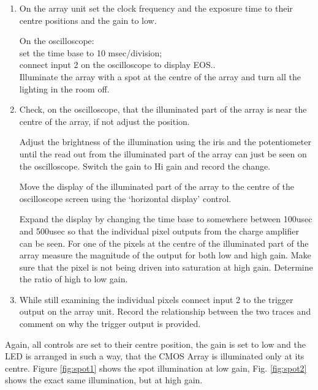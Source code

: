 \begin{enumerate}
	\item On the array unit set the clock frequency and the exposure time to their centre positions and
the gain to low.

On the oscilloscope:\\
set the time base to 10 msec/division;\\
connect input 2 on the oscilloscope to display EOS..\\
Illuminate the array with a spot at the centre of the array and turn all the lighting in the room
off.
	\item Check, on the oscilloscope, that the illuminated part of the array is near the centre of the
array, if not adjust the position.

Adjust the brightness of the illumination using the iris and the potentiometer until the read
out from the illuminated part of the array can just be seen on the oscilloscope. Switch the
gain to Hi gain and record the change.

Move the display of the illuminated part of the array to the centre of the oscilloscope screen
using the ‘horizontal display’ control.

Expand the display by changing the time base to somewhere between 100usec and 500usec
so that the individual pixel outputs from the charge amplifier can be seen. For one of the
pixels at the centre of the illuminated part of the array measure the magnitude of the output
for both low and high gain. Make sure that the pixel is not being driven into saturation at
high gain. Determine the ratio of high to low gain.

	\item While still examining the individual pixels connect input 2 to the trigger output on the array
unit. Record the relationship between the two traces and comment on why the trigger
output is provided.
\end{enumerate}

Again, all controls are set to their centre position, the gain is set to low and the LED is arranged in such a way, that the CMOS Array is illuminated only at its centre.
Figure \ref{fig:spot1} shows the spot illumination at low gain, Fig. \ref{fig:spot2} shows the exact same illumination, but at high gain.



